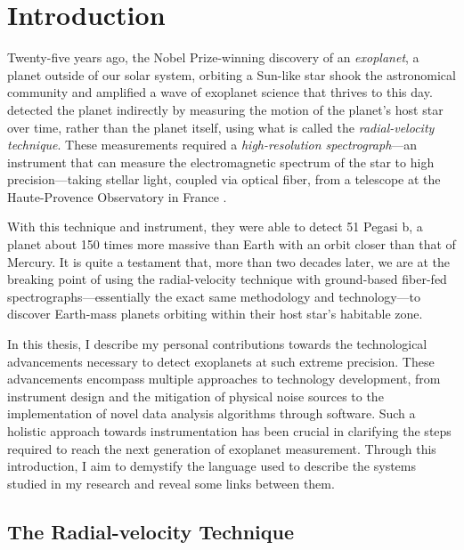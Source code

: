 \chapter{Introduction} \label{intro}

Twenty-five years ago, the Nobel Prize-winning discovery of an \textit{exoplanet}, a planet outside of our solar system, orbiting a Sun-like star shook the astronomical community and amplified a wave of exoplanet science that thrives to this day. \citet{mayor_jupiter-mass_1995} detected the planet indirectly by measuring the motion of the planet's host star over time, rather than the planet itself, using what is called the \textit{radial-velocity technique}. These measurements required a \textit{high-resolution spectrograph}---an instrument that can measure the electromagnetic spectrum of the star to high precision---taking stellar light, coupled via optical fiber, from a telescope at the Haute-Provence Observatory in France \citep{baranne_elodie_1996}.

With this technique and instrument, they were able to detect 51 Pegasi b, a planet about 150 times more massive than Earth with an orbit closer than that of Mercury. It is quite a testament that, more than two decades later, we are at the breaking point of using the radial-velocity technique with ground-based fiber-fed spectrographs---essentially the exact same methodology and technology---to discover Earth-mass planets orbiting within their host star's habitable zone.

In this thesis, I describe my personal contributions towards the technological advancements necessary to detect exoplanets at such extreme precision. These advancements encompass multiple approaches to technology development, from instrument design and the mitigation of physical noise sources to the implementation of novel data analysis algorithms through software. Such a holistic approach towards instrumentation has been crucial in clarifying the steps required to reach the next generation of exoplanet measurement. Through this introduction, I aim to demystify the language used to describe the systems studied in my research and reveal some links between them.

\section{The Radial-velocity Technique} \label{intro:eprv}

